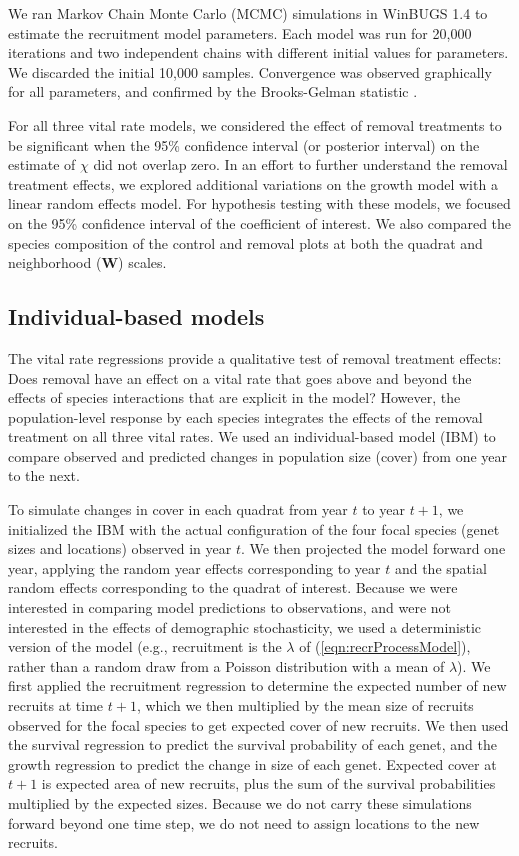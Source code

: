 \documentclass[11pt]{article}
\begin{document}
\begin{doublespacing}
We ran Markov Chain Monte Carlo (MCMC) simulations in WinBUGS 1.4 \citep{lunn_winbugs_2000} to estimate the recruitment model parameters. Each model was run for 20,000 iterations and two independent chains with different initial values for parameters. We discarded the initial 10,000 samples. Convergence was observed graphically for all parameters, and confirmed by the Brooks-Gelman statistic \citep{brooks_general_1998}. 

For all three vital rate models, we considered the effect of removal treatments to be significant when the 95\% confidence interval (or posterior
interval) on the estimate of $\chi$ did not overlap zero. In an effort to further understand the removal treatment effects, we explored additional variations on the growth model with a linear random effects model. For hypothesis testing with these models, we focused on the 95\% confidence interval of the coefficient of interest. We also compared the species composition of the control and removal plots at both the quadrat and neighborhood ($\boldsymbol{W}$) scales.

\subsection*{Individual-based models}

The vital rate regressions provide a qualitative test of removal treatment effects: Does removal have an effect on a vital rate that goes above and beyond the effects of species interactions that are explicit in the model? However, the population-level response by each species integrates the effects of the removal treatment on all three vital rates. We used an individual-based model (IBM) to compare observed and predicted changes 
in population size (cover) from one year to the next. 

To simulate changes in cover in each quadrat from year $t$ to year $t+1$, we initialized the IBM with the actual configuration of the four focal species (genet sizes and locations) observed in year $t$. We then projected the model forward one year, applying the random year effects corresponding to year $t$ and the spatial random effects corresponding to the quadrat of interest. Because we were interested in comparing model predictions to observations, and were not interested in the effects of demographic stochasticity, we used a deterministic version of the model (e.g., recruitment is the $\lambda$ of (\ref{eqn:recrProcessModel}), rather than a random draw from a Poisson distribution with a mean of $\lambda$).
We first applied the recruitment regression to determine the expected number of new recruits at time $t+1$, which we then multiplied by the mean size of recruits observed for the focal species to get expected cover of new recruits. We then used the survival regression to predict the survival probability of each genet, and the growth regression to predict the change in size of each genet. Expected cover at $t+1$ is expected area of new recruits, plus the sum of the survival probabilities multiplied by the expected sizes. Because we do not carry these simulations forward beyond one time step, we do not need to assign locations to the new recruits.


\end{doublespacing}
\end{document}

